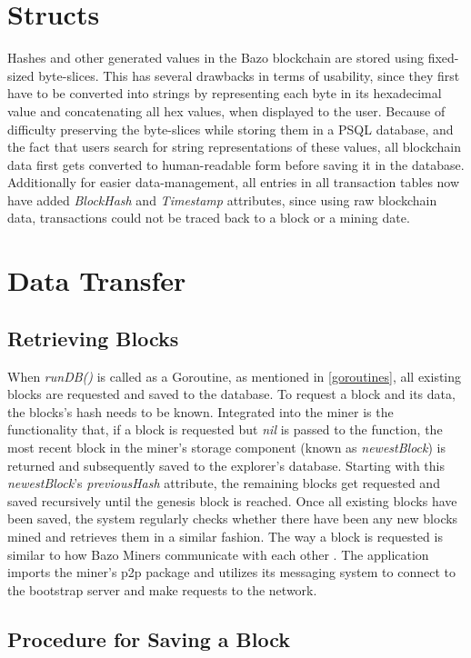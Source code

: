 \section{Structs}
Hashes and other generated values in the Bazo blockchain are stored using fixed-sized byte-slices. This has several drawbacks in terms of usability, since they first have to be converted into strings by representing each byte in its hexadecimal value and concatenating all hex values, when displayed to the user. Because of difficulty preserving the byte-slices while storing them in a PSQL database, and the fact that users search for string representations of these values, all blockchain data first gets converted to human-readable form before saving it in the database. Additionally for easier data-management, all entries in all transaction tables now have added \emph{BlockHash} and \emph{Timestamp} attributes, since using raw blockchain data, transactions could not be traced back to a block or a mining date.

\section{Data Transfer} \label{data}

\subsection{Retrieving Blocks} \label{retrieve}
When \emph{runDB()} is called as a Goroutine, as mentioned in \ref{goroutines}, all existing blocks are requested and saved to the database. To request a block and its data, the blocks's hash needs to be known. Integrated into the miner is the functionality that, if a block is requested but \emph{nil} is passed to the function, the most recent block in the miner's storage component (known as \emph{newestBlock}) is returned and subsequently saved to the explorer's database. Starting with this  \emph{newestBlock}'s \emph{previousHash} attribute, the remaining blocks get requested and saved recursively until the genesis block is reached. Once all existing blocks have been saved, the system regularly checks whether there have been any new blocks mined and retrieves them in a similar fashion.
The way a block is requested is similar to how Bazo Miners communicate with each other \cite{bazo}. The application imports the miner's p2p package and utilizes its messaging system to connect to the bootstrap server and make requests to the network.

\subsection{Procedure for Saving a Block} \

